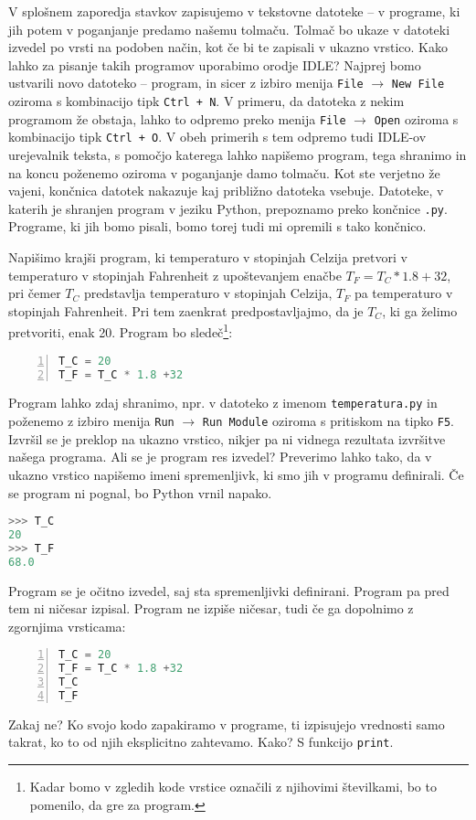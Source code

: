 V splošnem zaporedja stavkov zapisujemo v tekstovne datoteke -- v programe, ki jih potem v poganjanje predamo našemu tolmaču. Tolmač bo ukaze v datoteki izvedel po vrsti na podoben način, kot če bi te zapisali v ukazno vrstico. Kako lahko za pisanje takih programov uporabimo orodje IDLE? Najprej bomo ustvarili novo datoteko -- program, in sicer z izbiro menija \texttt{File} $\rightarrow$ \texttt{New File} oziroma s kombinacijo tipk \texttt{Ctrl + N}. V primeru, da datoteka z nekim programom že obstaja, lahko to odpremo preko menija \texttt{File} $\rightarrow$ \texttt{Open} oziroma s kombinacijo tipk \texttt{Ctrl + O}. V obeh primerih s tem odpremo tudi IDLE-ov urejevalnik teksta, s pomočjo katerega lahko napišemo program, tega shranimo in na koncu poženemo oziroma v poganjanje damo tolmaču. Kot ste verjetno že vajeni, končnica datotek nakazuje kaj približno datoteka vsebuje. Datoteke, v katerih je shranjen program v jeziku Python, prepoznamo preko končnice \texttt{.py}. Programe, ki jih bomo pisali, bomo torej tudi mi opremili s tako končnico.

Napišimo krajši program, ki temperaturo v stopinjah Celzija pretvori v temperaturo v stopinjah Fahrenheit z upoštevanjem enačbe $T_F = T_C * 1.8 +32$, pri čemer $T_C$ predstavlja temperaturo v stopinjah Celzija, $T_F$ pa temperaturo v stopinjah Fahrenheit. Pri tem zaenkrat predpostavljajmo, da je $T_C$, ki ga želimo pretvoriti, enak 20. Program bo sledeč\footnote{Kadar bomo v zgledih kode vrstice označili z njihovimi številkami, bo to pomenilo, da gre za program.}:
\begin{lstlisting}[language=Python,numbers=left]
T_C = 20
T_F = T_C * 1.8 +32
\end{lstlisting}
Program lahko zdaj shranimo, npr. v datoteko z imenom \texttt{temperatura.py} in poženemo z izbiro menija \texttt{Run} $\rightarrow$ \texttt{Run Module} oziroma s pritiskom na tipko \texttt{F5}. Izvršil se je preklop na ukazno vrstico, nikjer pa ni vidnega rezultata izvršitve našega programa. Ali se je program res izvedel? Preverimo lahko tako, da v ukazno vrstico napišemo imeni spremenljivk, ki smo jih v programu definirali. Če se program ni pognal, bo Python vrnil napako.
\begin{lstlisting}[language=Python]
>>> T_C
20
>>> T_F
68.0
\end{lstlisting}
Program se je očitno izvedel, saj sta spremenljivki definirani. Program pa pred tem ni ničesar izpisal. Program ne izpiše ničesar, tudi če ga dopolnimo z zgornjima vrsticama:
\begin{lstlisting}[language=Python,numbers=left]
T_C = 20
T_F = T_C * 1.8 +32
T_C
T_F
\end{lstlisting}
Zakaj ne? Ko svojo kodo zapakiramo v programe, ti izpisujejo vrednosti samo takrat, ko to od njih eksplicitno zahtevamo. Kako? S funkcijo \texttt{print}.

